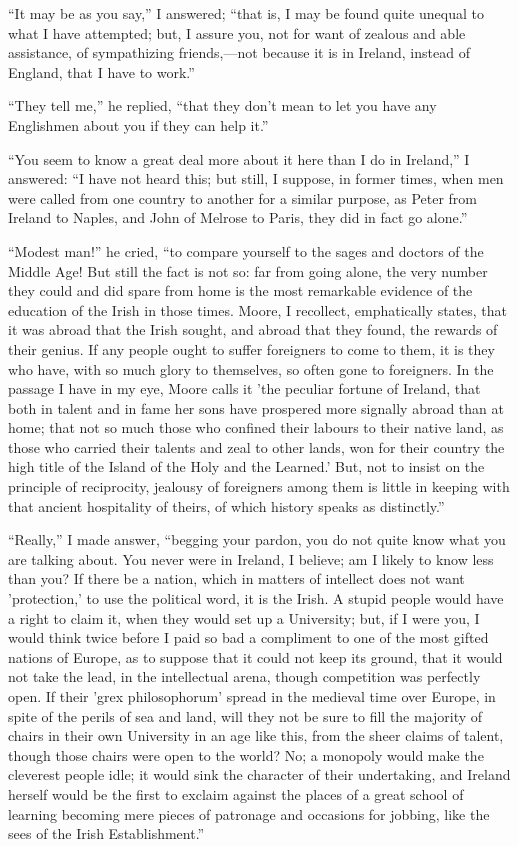 ``It may be as you say,'' I answered; ``that is, I may
be found quite unequal to what I have attempted; but, I assure you,
not for want of zealous and able assistance, of sympathizing friends,—not
because it is in Ireland, instead of England, that I have to
work.''

``They tell me,'' he replied, ``that they don't mean to
let you have any Englishmen about you if they can help it.''

``You seem to know a great deal more about it here than I do in
Ireland,'' I answered: ``I have not heard this; but still, I
suppose, in former times, when men were called from one country to
another for a similar purpose, as Peter from Ireland to Naples, and
John of Melrose to Paris, they did in fact go alone.''

``Modest man!'' he cried, ``to compare yourself to the
sages and doctors of the Middle Age! But still the fact is not so: far
from going alone, the very number they could and did spare from home
is the most remarkable evidence of the education of the Irish in those
times. Moore, I recollect, emphatically states, that it was abroad
that the Irish sought, and abroad that they found, the rewards of
their genius. If any people ought to suffer foreigners to come to
them, it is they who have, with so much glory to themselves, so often
gone to foreigners. In the passage I have in my eye, Moore calls it
'the peculiar fortune of Ireland, that both in talent and in fame her
sons have prospered more signally abroad than at home; that not so
much those who confined their labours to their native land, as those
who carried their talents and zeal to other lands, won for their
country the high title of the Island of the Holy and the Learned.'
But, not to insist on the principle of reciprocity, jealousy of
foreigners among them is little in keeping with that ancient
hospitality of theirs, of which history speaks as distinctly.''

``Really,'' I made answer, ``begging your pardon, you
do not quite know what you are talking about. You never were in
Ireland, I believe; am I likely to know less than you? If there be a
nation, which in matters of intellect does not want 'protection,' to
use the political word, it is the Irish. A stupid people would have a
right to claim it, when they would set up a University; but, if I were
you, I would think twice before I paid so bad a compliment to one of
the most gifted nations of Europe, as to suppose that it could not
keep its ground, that it would not take the lead, in the intellectual
arena, though competition was perfectly open. If their 'grex
philosophorum' spread in the medieval time over Europe, in spite of
the perils of sea and land, will they not be sure to fill the majority
of chairs in their own University in an age like this, from the sheer
claims of talent, though those chairs were open to the world? No; a
monopoly would make the cleverest people idle; it would sink the
character of their undertaking, and Ireland herself would be the first
to exclaim against the places of a great school of learning becoming
mere pieces of patronage and occasions for jobbing, like the sees
of the Irish Establishment.''

